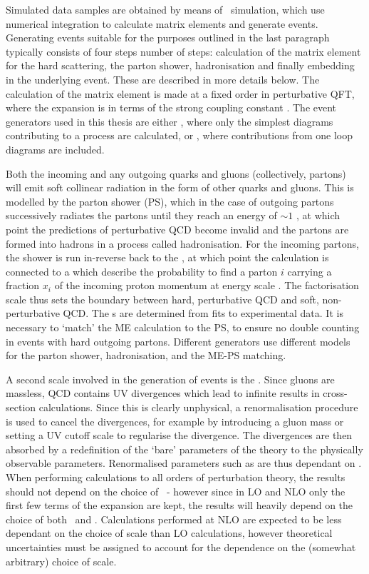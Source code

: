 Simulated data samples are obtained by
means of \mc\ simulation, which use numerical integration to calculate matrix
elements and generate events. Generating events suitable for the purposes
outlined in the last paragraph typically consists of four steps number of steps:
calculation of the matrix element for the hard scattering, the parton shower,
hadronisation and finally embedding in the underlying event. These are described
in more details below. The calculation of the matrix element is
made at a fixed order in perturbative QFT, where the expansion is in terms of
the strong coupling constant \alphaS. The event generators used in this thesis
are either , where only the simplest diagrams
contributing to a process are calculated, or ,
where contributions from one loop diagrams are included. 

Both the incoming and any outgoing quarks and gluons
(collectively, partons) will emit soft collinear radiation in the form of other quarks and gluons. This is
modelled by the parton shower (PS), which in the case of outgoing partons
successively radiates the partons until they reach an energy of $\sim 1$ \gev, at
which point the predictions of perturbative QCD become invalid and the partons
are formed into hadrons in a process called hadronisation. For the incoming partons, the
shower is run in-reverse back to the , at which
point the calculation is connected to a  which describe the probability to find a parton $i$ carrying a
fraction $x_i$ of the incoming proton momentum at energy scale \uF. The
factorisation scale thus sets the boundary between hard, perturbative QCD and
soft, non-perturbative QCD. The \partDF s are determined from fits to
experimental data. It is necessary to `match' the
ME calculation to the PS, to ensure no double counting in events with hard
outgoing partons. Different generators use different models for the parton
shower, hadronisation, and the ME-PS matching.

A second scale involved in the generation of events is the
. Since gluons are massless, QCD contains UV
divergences which lead to infinite results in cross-section calculations. Since 
this is clearly unphysical, a renormalisation procedure is used to cancel the
divergences, for example by introducing a gluon mass or setting a UV cutoff
scale to regularise the divergence. The divergences are then absorbed by a
redefinition of the `bare' parameters of the theory to the physically observable
parameters. Renormalised parameters such as \alphaS are thus dependant on \uR.
When performing calculations to all orders of perturbation theory,  the results
should not depend on the choice of \uR\ - however since in LO and NLO only the
first few terms of the expansion are kept, the results will heavily depend on
the choice of both \uR\ and \uF. Calculations performed at NLO are expected to
be less dependant on the choice of scale than LO calculations, however
theoretical uncertainties must be assigned to account for the dependence on the
(somewhat arbitrary) choice of scale.

